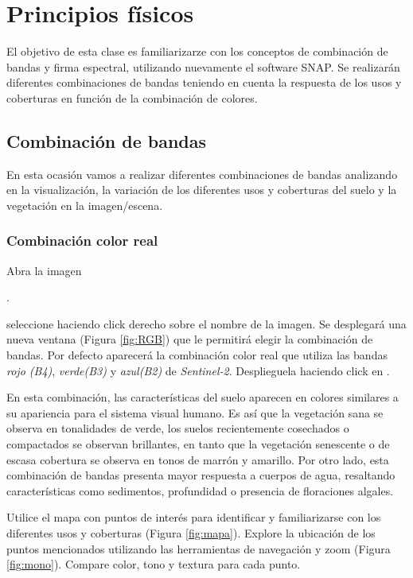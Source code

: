 \chapter{Principios físicos}

El objetivo de esta clase es familiarizarze con los conceptos de combinación de bandas y firma espectral, utilizando nuevamente el software SNAP. Se realizarán diferentes combinaciones de bandas teniendo en cuenta la respuesta de los usos y coberturas en función de la combinación de colores. 





\section{Combinación de bandas}
En esta ocasión vamos a realizar diferentes combinaciones de bandas analizando en la visualización, la variación de los diferentes usos y coberturas del suelo y la vegetación en la imagen/escena.


\subsection{Combinación color real}\label{sec:colorreal}

Abra la imagen \begin{center} .
\end{center} seleccione  haciendo click derecho sobre el nombre de la imagen. Se desplegará una nueva ventana (Figura \ref{fig:RGB}) que le permitirá elegir la combinación de bandas. Por defecto aparecerá la combinación color real que utiliza las bandas \emph{rojo (B4)}, \emph{verde(B3)} y \emph{azul(B2)} de \emph{Sentinel-2}. Desplieguela haciendo click en .

En esta combinación, las características del suelo aparecen en colores similares a su apariencia para el sistema visual humano. Es así que la vegetación sana se observa en tonalidades de verde, los suelos recientemente cosechados o compactados se observan brillantes, en tanto que la vegetación senescente o de escasa cobertura se observa en tonos de marrón y amarillo. Por otro lado, esta combinación de bandas presenta mayor respuesta a cuerpos de agua, resaltando características como sedimentos, profundidad o presencia de floraciones algales.

Utilice el mapa con puntos de interés para identificar y familiarizarse con los diferentes usos y coberturas (Figura \ref{fig:mapa}). Explore la ubicación de los puntos mencionados utilizando las herramientas de navegación y zoom  (Figura \ref{fig:mono}). Compare color, tono y textura para cada punto.


